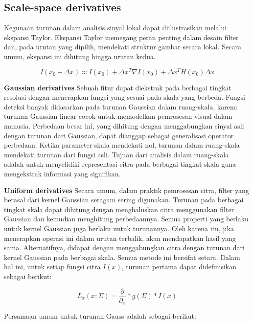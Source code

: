 \subsection{Scale-space derivatives}
\label{subsec:scalespace}

Kegunaan turunan dalam analisis sinyal lokal dapat diilustrasikan melalui ekspansi Taylor. 
Ekspansi Taylor memegang peran penting dalam desain filter dan, pada urutan yang dipilih, mendekati struktur gambar secara lokal. 
Secara umum, ekspansi ini dihitung hingga urutan kedua.

\begin{equation*}
  I(x_{0} +\Delta x) \approx I(x_{0}) + \Delta x^{T}\nabla  I(x_{0}) + \Delta x^{T} H(x_{0}) \Delta x
\end{equation*}

\textbf{Gaussian derivatives} Sebuah fitur dapat diekstrak pada berbagai tingkat resolusi dengan menerapkan fungsi yang sesuai pada skala yang berbeda. 
Fungsi deteksi banyak didasarkan pada turunan Gaussian dalam ruang-skala, karena turunan Gaussian linear cocok untuk memodelkan pemrosesan visual dalam manusia. 
Perbedaan besar ini, yang dihitung dengan menggabungkan sinyal asli dengan turunan dari Gaussian, dapat dianggap sebagai generalisasi operator perbedaan. 
Ketika parameter skala mendekati nol, turunan dalam ruang-skala mendekati turunan dari fungsi asli. 
Tujuan dari analisis dalam ruang-skala adalah untuk menyelidiki representasi citra pada berbagai tingkat skala guna mengekstrak informasi yang signifikan.

\textbf{Uniform derivatives} Secara umum, dalam praktik pemrosesan citra, filter yang berasal dari kernel Gaussian seragam sering digunakan. 
Turunan pada berbagai tingkat skala dapat dihitung dengan menghaluskan citra menggunakan filter Gaussian dan kemudian menghitung perbedaannya. 
Semua properti yang berlaku untuk kernel Gaussian juga berlaku untuk turunannya. Oleh karena itu, jika menerapkan operasi ini dalam urutan terbalik, 
akan mendapatkan hasil yang sama. Alternatifnya, didapat dengan menggabungkan citra dengan turunan dari kernel Gaussian pada berbagai skala. 
Semua metode ini bersifat setara. Dalam hal ini, untuk setiap fungsi citra \(I(x)\), turunan pertama dapat didefinisikan sebagai berikut:

\begin{equation*}
  L_{x}(x;\Sigma) = \frac{\partial}{\partial_{x}} * g(\Sigma) * I(x)
\end{equation*}

Persamaan umum untuk turunan Gauss adalah sebagai berikut:

